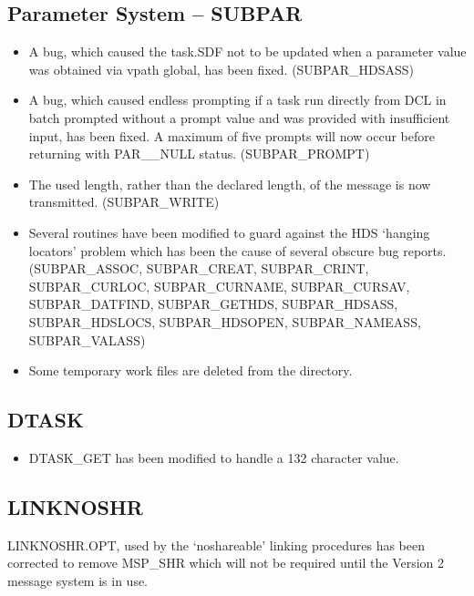 \subsection{Parameter System -- SUBPAR}
\begin{itemize}
\item A bug, which caused the task.SDF not to be updated when a parameter
value was obtained via vpath global, has been fixed. (SUBPAR\-\_HDSASS)

\item A bug, which caused endless prompting if a task run directly from DCL
in batch prompted without a prompt value and was provided with insufficient 
input, has been fixed. A maximum of five prompts will now occur before
returning with PAR\_\_NULL status. (SUBPAR\-\_PROMPT)

\item The used length, rather than the declared length, of the message is
now transmitted. (SUBPAR\-\_WRITE)

\item Several routines have been modified to guard against the HDS `hanging
locators' problem which has been the cause of several obscure bug reports.
(SUBPAR\-\_ASSOC,
SUBPAR\-\_CREAT,
SUBPAR\-\_CRINT,
SUBPAR\-\_CUR\-LOC,
SUBPAR\-\_CUR\-NAME, 
SUBPAR\-\_CUR\-SAV,
SUBPAR\-\_DAT\-FIND,
SUBPAR\-\_GET\-HDS,
SUBPAR\-\_HDS\-ASS,
SUBPAR\-\_HDS\-LOCS,
SUBPAR\-\_HDS\-OPEN,
SUBPAR\-\_NAME\-ASS,
SUBPAR\-\_VAL\-ASS)

\item Some temporary work files are deleted from the directory.

\end{itemize}

\subsection{DTASK}
\label{dtask}
\begin{itemize}
\item DTASK\_GET has been modified to handle a 132 character value.
\end{itemize}

\subsection{LINKNOSHR}
LINKNOSHR.OPT, used by the `noshareable' linking procedures has been 
corrected to remove MSP\_SHR which will not be required until the Version 2 
message system is in use.

